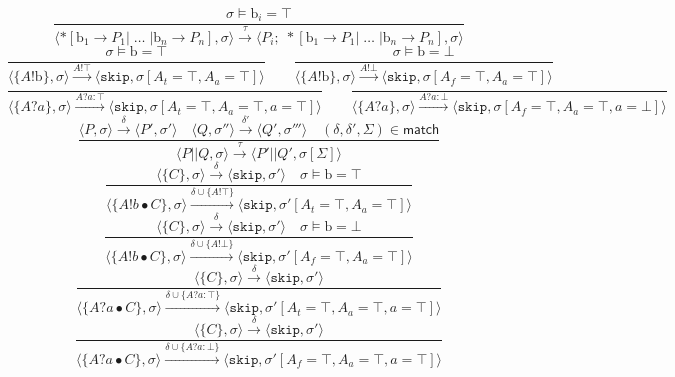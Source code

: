 \documentclass[times, 10pt]{article}
\begin{document}
$$    \frac{\sigma \models \mathrm{b}_i = \top} {\langle *[ \mathrm{b}_1 \rightarrow P_1  | \; \ldots \; | \mathrm{b}_n \rightarrow P_n ] , \sigma \rangle \xrightarrow{\tau} \langle P_i;\;*[ \mathrm{b}_1 \rightarrow P_1  | \; \ldots \; | \mathrm{b}_n \rightarrow P_n ] , \sigma\rangle  } $$$$
    \frac{\sigma \models \mathrm{b} = \top}{\langle \{A!\mathrm{b}\}, \sigma \rangle \xrightarrow{A!\top} \langle \mathtt{skip}, \sigma[A_t = \top, A_a = \top] \rangle} \qquad
    \frac{\sigma \models \mathrm{b} = \bot}{\langle \{A!\mathrm{b}\}, \sigma \rangle \xrightarrow{A!\bot} \langle \mathtt{skip}, \sigma[A_f = \top, A_a = \top] \rangle} $$$$
    \frac{}{\langle \{A?a\}, \sigma \rangle \xrightarrow{A?a : \top} \langle \mathtt{skip}, \sigma[A_t = \top, A_a = \top, a = \top] \rangle} \qquad
    \frac{}{\langle \{A?a\}, \sigma \rangle \xrightarrow{A?a : \bot} \langle \mathtt{skip}, \sigma[A_f = \top, A_a = \top, a = \bot] \rangle} $$$$
    \frac{\langle P, \sigma \rangle \xrightarrow{\delta} \langle P', \sigma' \rangle \quad \langle Q, \sigma'' \rangle \xrightarrow{\delta'} \langle Q', \sigma''' \rangle \quad (\delta, \delta', \Sigma) \in \mathsf{match}}{\langle P || Q, \sigma \rangle \xrightarrow{\tau} \langle P' || Q', \sigma[\Sigma] \rangle} $$$$
    \frac{\langle \{C\}, \sigma \rangle \xrightarrow{\delta} \langle \mathtt{skip}, \sigma' \rangle \quad \sigma \models \mathrm{b} = \top}{\langle \{A!b \bullet C\}, \sigma \rangle \xrightarrow{\delta \cup \{A!\top\}} \langle \mathtt{skip}, \sigma'[A_t = \top, A_a = \top] \rangle} $$$$
    \frac{\langle \{C\}, \sigma \rangle \xrightarrow{\delta} \langle \mathtt{skip}, \sigma' \rangle \quad \sigma \models \mathrm{b} = \bot}{\langle \{A!b \bullet C\}, \sigma \rangle \xrightarrow{\delta \cup \{A!\bot\}} \langle \mathtt{skip}, \sigma'[A_f = \top, A_a = \top] \rangle} $$$$
    \frac{\langle \{C\}, \sigma \rangle \xrightarrow{\delta} \langle \mathtt{skip}, \sigma' \rangle}{\langle \{A?a \bullet C\}, \sigma \rangle \xrightarrow{\delta \cup \{A?a : \top\}} \langle \mathtt{skip}, \sigma'[A_t = \top, A_a = \top, a = \top] \rangle} $$$$
    \frac{\langle \{C\}, \sigma \rangle \xrightarrow{\delta} \langle \mathtt{skip}, \sigma' \rangle}{\langle \{A?a \bullet C\}, \sigma \rangle \xrightarrow{\delta \cup \{A?a : \bot\}} \langle \mathtt{skip}, \sigma'[A_f = \top, A_a = \top, a = \top] \rangle} $$$$
$$
\end{document}
